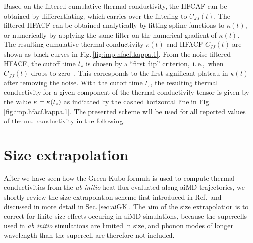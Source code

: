 Based on the filtered cumulative thermal conductivity, the HFCAF can be obtained by differentiating, which carries over the filtering to $C_{JJ} (t)$. The filtered HFACF can be obtained analytically by fitting spline functions to $\kappa (t)$, or numerically by applying the same filter on the numerical gradient of $\kappa (t)$. The resulting cumulative thermal conductivity $\kappa (t)$ and HFACF $C_{JJ} (t)$ are shown as black curves in Fig.\,\ref{fig:imp.hfacf.kappa.1}. From the noise-filtered HFACF, the cutoff time $t_{\rm c}$ is chosen by a ``first dip'' criterion,~i.\,e.,~when $C_{JJ} (t)$ drops to zero~\cite{Chen.2010}. This corresponds to the first significant plateau in $\kappa (t)$ after removing the noise. With the cutoff time $t_{\rm c}$, the resulting thermal conductivity for a given component of the thermal conductivity tensor is given by the value $\kappa = \kappa (t_{\rm c})$ as indicated by the dashed horizontal line in Fig.\,\ref{fig:imp.hfacf.kappa.1}.
The presented scheme will be used for all reported values of thermal conductivity in the following.

\section{Size extrapolation}
\label{sec:imp.extrapolation}

After we have seen how the Green-Kubo formula is used to compute thermal conductivities from the \emph{ab initio} heat flux evaluated along aiMD trajectories, we shortly review the size extrapolation scheme first introduced in Ref.\,\cite{Carbogno.2016} and discussed in more detail in Sec.\,\ref{sec:aiGK}. The aim of the size extrapolation is to correct for finite size effects occuring in aiMD simulations, because the supercells used in \emph{ab initio} simulations are limited in size, and phonon modes of longer wavelength than the supercell are therefore not included. 

